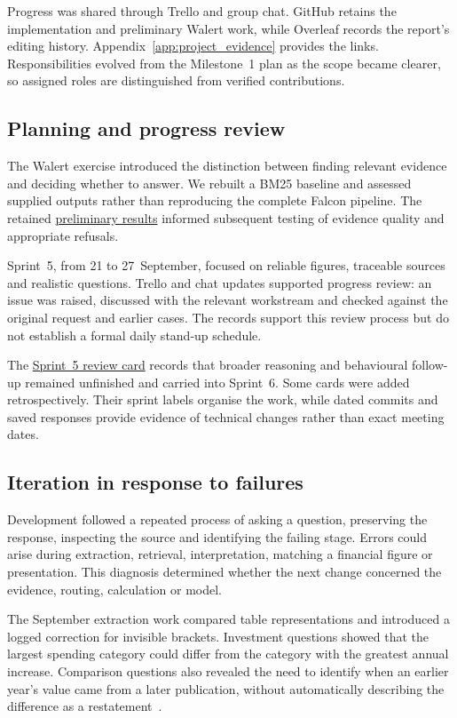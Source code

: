 Progress was shared through Trello and group chat. GitHub retains the implementation and preliminary Walert work, while Overleaf records the report's editing history. Appendix~\ref{app:project_evidence} provides the links. Responsibilities evolved from the Milestone~1 plan as the scope became clearer, so assigned roles are distinguished from verified contributions.

\subsection{Planning and progress review}
The Walert exercise introduced the distinction between finding relevant evidence and deciding whether to answer. We rebuilt a BM25 baseline and assessed supplied outputs rather than reproducing the complete Falcon pipeline. The retained \href{https://github.com/AyushiNegi20/COSC2669-WIL-PROJECT/blob/report-submission-2026-10-25/walert_reproduction/RESULTS.md}{preliminary results} informed subsequent testing of evidence quality and appropriate refusals.

Sprint~5, from 21 to 27~September, focused on reliable figures, traceable sources and realistic questions. Trello and chat updates supported progress review: an issue was raised, discussed with the relevant workstream and checked against the original request and earlier cases. The records support this review process but do not establish a formal daily stand-up schedule.

The \href{https://trello.com/c/akurkkvG}{Sprint~5 review card} records that broader reasoning and behavioural follow-up remained unfinished and carried into Sprint~6. Some cards were added retrospectively. Their sprint labels organise the work, while dated commits and saved responses provide evidence of technical changes rather than exact meeting dates.

\subsection{Iteration in response to failures}
Development followed a repeated process of asking a question, preserving the response, inspecting the source and identifying the failing stage. Errors could arise during extraction, retrieval, interpretation, matching a financial figure or presentation. This diagnosis determined whether the next change concerned the evidence, routing, calculation or model.

The September extraction work compared table representations and introduced a logged correction for invisible brackets. Investment questions showed that the largest spending category could differ from the category with the greatest annual increase. Comparison questions also revealed the need to identify when an earlier year's value came from a later publication, without automatically describing the difference as a restatement~\cite{fintraceExtraction2026,fintraceCandidate2026}.

